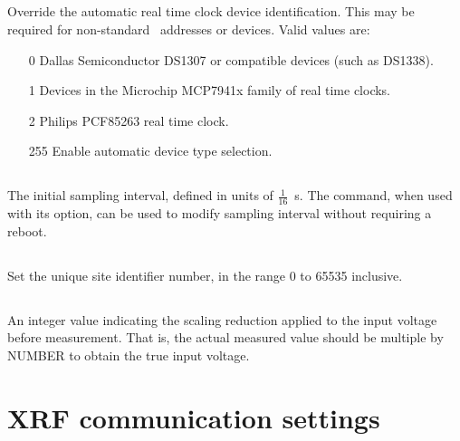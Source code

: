 \subsection[rtcx-device-type]{}
Override the automatic real time clock device identification. This may
be required for non-standard \itwoc\ addresses or devices. Valid
values are:
\begin{enumerate}
\item[0] Dallas Semiconductor DS1307 or compatible devices (such as
  DS1338).
\item[1] Devices in the Microchip MCP7941x family of real time clocks.
\item[2] Philips PCF85263 real time clock.
\item[255] Enable automatic device type selection.
\end{enumerate}



\subsection[sampling-interval-16th-s]{}
\label{sec:eeprom-sampling-interval}

The initial sampling interval, defined in units of
$\frac{1}{16}$\SI{}{\second}. The  command, when
used with its  option, can be used to modify
sampling interval without requiring a reboot.

\subsection[site-id]{}
Set the unique site identifier number, in the range 0 to 65535 inclusive.

\subsection[vin-divider]{}

An integer value indicating the scaling reduction applied to the input voltage
before measurement. That is, the actual measured value should be multiple by
NUMBER to obtain the true input voltage.


\section{XRF communication settings}

